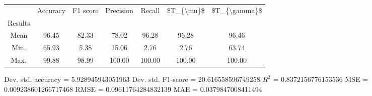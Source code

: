 \begin{tabular}{|c|c|c|c|c|c|c|}
\toprule
{} &  Accuracy &  F1 score &  Precision &  Recall &  \$T\_\{\textbackslash mu\}\$ &  \$T\_\{\textbackslash gamma\}\$ \\
Results &           &           &            &         &            &               \\
\hline
Mean    &     96.45 &     82.33 &      78.02 &   96.28 &      96.28 &         96.46 \\
Min.    &     65.93 &      5.38 &      15.06 &    2.76 &       2.76 &         63.74 \\
Max.    &     99.88 &     98.99 &     100.00 &  100.00 &     100.00 &        100.00 \\
\bottomrule
\end{tabular}

 Dev. std. accuracy = 5.928945943051963
 Dev. std. F1-score = 20.616558596749258
 $R^2$ = 0.8372156776153536
 MSE = 0.009238601266717468
 RMSE = 0.09611764284832139
 MAE = 0.0379847008411494